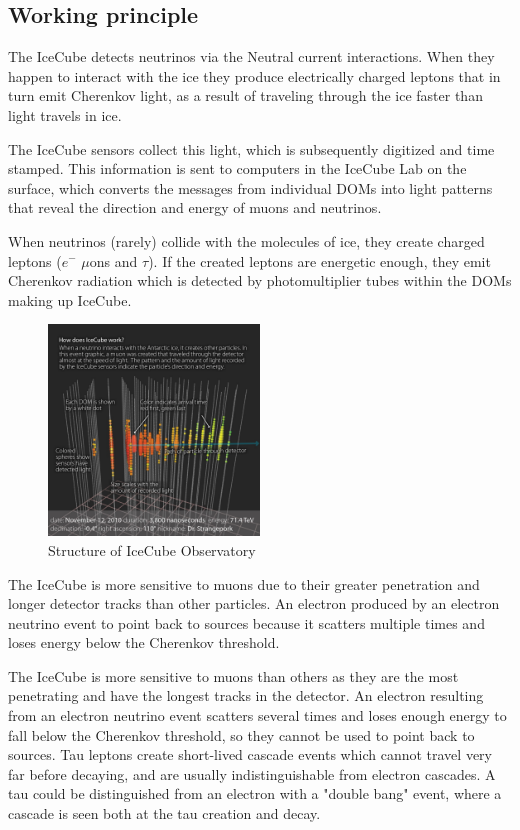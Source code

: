\documentclass{article}
\begin{document}
\subsection{\large Working principle}
The IceCube detects neutrinos via the Neutral current interactions. 
When they happen to interact with the ice they produce electrically charged leptons that in turn emit Cherenkov light, as a result of traveling through the ice faster than light travels in ice.

The IceCube sensors collect this light, which is subsequently digitized and time stamped. This information is sent to computers in the IceCube Lab on the surface, which converts the messages from individual DOMs into light patterns that reveal the direction and energy of muons and neutrinos.

When neutrinos (rarely) collide with the molecules of ice, they create charged leptons ($e^-$ $\mu$ons and $\tau$). If the created leptons are energetic enough, they emit Cherenkov radiation which is detected by photomultiplier tubes within the DOMs making up IceCube.

\begin{figure}[htb]
    \centering
    \includegraphics[width=0.5\textwidth,keepaspectratio]{Images/how_does_icecube_work.jpg}
    \caption{Structure of IceCube Observatory}
    \label{fig:IC_schematic}
\end{figure}
The IceCube is more sensitive to muons due to their greater penetration and longer detector tracks than other particles. An electron produced by an electron neutrino event to point back to sources because it scatters multiple times and loses energy below the Cherenkov threshold.




The IceCube is more sensitive to muons than others as they are the most penetrating and have the longest tracks in the detector. An electron resulting from an electron neutrino event scatters several times and loses enough energy to fall below the Cherenkov threshold, so they cannot be used to point back to sources. Tau leptons create short-lived cascade events which cannot travel very far before decaying, and are usually indistinguishable from electron cascades. A tau could be distinguished from an electron with a "double bang" event, where a cascade is seen both at the tau creation and decay. 
\end{document}
